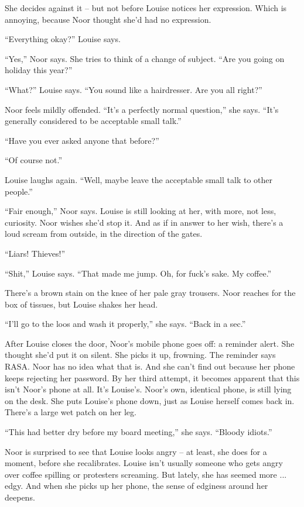 \documentclass[12pt,a5paper]{book}
\newcommand{\qm}[1]{“#1”}
\begin{document}
She decides against it – but not before Louise notices her expression. Which is annoying, because Noor thought she'd had no expression.

\qm{Everything okay?} Louise says.

\qm{Yes,} Noor says. She tries to think of a change of subject. \qm{Are you going on holiday this year?}

\qm{What?} Louise says. \qm{You sound like a hairdresser. Are you all right?}

Noor feels mildly offended. \qm{It's a perfectly normal question,} she says. \qm{It's generally considered to be acceptable small talk.}

\qm{Have you ever asked anyone that before?}

\qm{Of course not.}

Louise laughs again. \qm{Well, maybe leave the acceptable small talk to other people.}

\qm{Fair enough,} Noor says. Louise is still looking at her, with more, not less, curiosity. Noor wishes she'd stop it. And as if in answer to her wish, there's a loud scream from outside, in the direction of the gates.

\qm{Liars! Thieves!}

\qm{Shit,} Louise says. \qm{That made me jump. Oh, for fuck's sake. My coffee.}

There's a brown stain on the knee of her pale gray trousers. Noor reaches for the box of tissues, but Louise shakes her head.

\qm{I'll go to the loos and wash it properly,} she says. \qm{Back in a sec.}

After Louise closes the door, Noor's mobile phone goes off: a reminder alert. She thought she'd put it on silent. She picks it up, frowning. The reminder says RASA. Noor has no idea what that is. And she can't find out because her phone keeps rejecting her password. By her third attempt, it becomes apparent that this isn't Noor's phone at all. It's Louise's. Noor's own, identical phone, is still lying on the desk. She puts Louise's phone down, just as Louise herself comes back in. There's a large wet patch on her leg.

\qm{This had better dry before my board meeting,} she says. \qm{Bloody idiots.}

Noor is surprised to see that Louise looks angry – at least, she does for a moment, before she recalibrates. Louise isn't usually someone who gets angry over coffee spilling or protesters screaming. But lately, she has seemed more ... edgy. And when she picks up her phone, the sense of edginess around her deepens.
\end{document}
